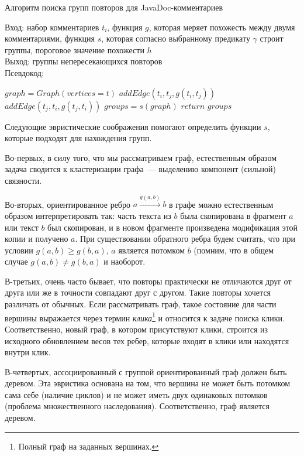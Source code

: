 \begin{algorithm}[t!]
\caption{Алгоритм поиска групп повторов для JavaDoc-комментариев}\label{alg:groupDuplicate}
Вход: набор комментариев $t_{i}$, функция $g$, которая меряет похожесть между двумя комментариями, функция $s$, которая согласно выбранному предикату $\gamma$ строит группы, пороговое значение похожести $h$\\
Выход: группы непересекающихся повторов\\
Псевдокод:
\begin{algorithmic}[1]
\State $graph = Graph(vertices=t)$
\State $addEdge(t_{i},t_{j},g(t_{i},t_{j}))$
\EndIf
{}
\State $addEdge(t_{j},t_{i},g(t_{j},t_{i}))$
\EndIf
\EndFor
\EndFor
\State $groups = s(graph)$
\State $return$ $groups$
\end{algorithmic}
\end{algorithm}


Следующие эвристические соображения помогают определить функции $s$, которые подходят для нахождения групп.

Во-первых, в силу того, что мы рассматриваем граф, естественным образом задача сводится к кластеризации графа~--- выделению компонент (сильной) связности.

Во-вторых, ориентированное ребро $a \xrightarrow{g(a,b)} b$ в графе можно естественным образом интерпретировать так: часть текста из $b$ была скопирована в фрагмент $a$ или текст $b$ был скопирован, и в новом фрагменте произведена модификация этой копии и получено $a$.
При существовании обратного ребра будем считать, что при условии $g(a,b)\geq g(b,a)$, $a$ является потомком $b$ (помним, что в общем случае $g(a,b)\neq g(b,a)$ и наоборот.

В-третьих, очень часто бывает, что повторы практически не отличаются друг от друга или же в точности совпадают друг с другом.
Такие повторы хочется различать от обычных.
Если рассматривать граф, такое состояние для части вершины выражается через термин \emph{клика}\footnote{Полный граф на заданных вершинах.} и относится к задаче поиска клики.
Соответственно, новый граф, в котором присутствуют клики, строится из исходного обновлением весов тех ребер, которые входят в клики или находятся внутри клик.


В-четвертых, ассоциированный с группой ориентированный граф должен быть деревом.
Эта эвристика основана на том, что вершина не может быть потомком сама себе (наличие циклов) и не может иметь двух одинаковых потомков (проблема множественного наследования).
Соответственно, граф является деревом.  

